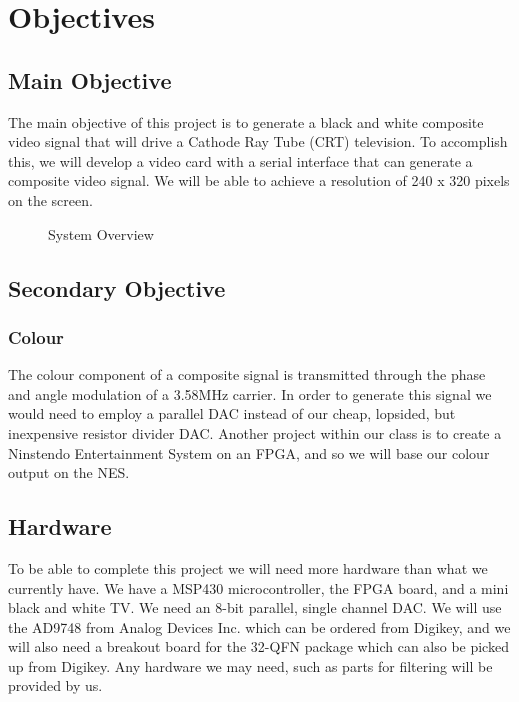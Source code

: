 \section{Objectives}

\subsection{Main Objective}

The main objective of this project is to generate a black and white composite
video signal that will drive a Cathode Ray Tube (CRT) television. To accomplish
this, we will develop a video card with a serial interface that can generate a
composite video signal. We will be able to achieve a resolution of 240 x 320
pixels on the screen.

\begin{figure}[H]
   \centering
   \caption{System Overview}
\end{figure}

\subsection{Secondary Objective}

\subsubsection{Colour}

The colour component of a composite signal is transmitted through the phase and
angle modulation of a 3.58MHz carrier. In order to generate this signal we would
need to employ a parallel DAC instead of our cheap, lopsided, but inexpensive
resistor divider DAC. Another project within our class is to create a Ninstendo
Entertainment System on an FPGA, and so we will base our colour output on the
NES.


\subsection{Hardware}

To be able to complete this project we will need more hardware than what we 
currently have. We have a MSP430 microcontroller, the FPGA board, and a mini
black and white TV. We need an 8-bit parallel, single channel DAC. We will use
the AD9748 from Analog Devices Inc. which can be ordered from Digikey, and we
will also need a breakout board for the 32-QFN package which can also be picked
up from Digikey. Any hardware we may need, such as parts for filtering will be
provided by us.
